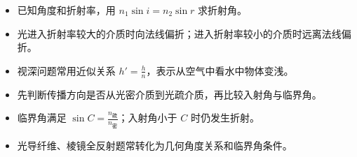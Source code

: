 \begin{casetypebox}[title={\strut\textcolor{white}{\bfseries 常见题型：折射定律}}]
\begin{itemize}[leftmargin=1.5em]
  \item 已知角度和折射率，用 $n_1\sin i=n_2\sin r$ 求折射角。
  \item 光进入折射率较大的介质时向法线偏折；进入折射率较小的介质时远离法线偏折。
  \item 视深问题常用近似关系 $h'=\frac{h}{n}$，表示从空气中看水中物体变浅。
\end{itemize}
\end{casetypebox}

\begin{casetypebox}[title={\strut\textcolor{white}{\bfseries 常见题型：全反射}}]
\begin{itemize}[leftmargin=1.5em]
  \item 先判断传播方向是否从光密介质到光疏介质，再比较入射角与临界角。
  \item 临界角满足 $\sin C=\frac{n_{\text{疏}}}{n_{\text{密}}}$；入射角小于 $C$ 时仍发生折射。
  \item 光导纤维、棱镜全反射题常转化为几何角度关系和临界角条件。
\end{itemize}
\end{casetypebox}